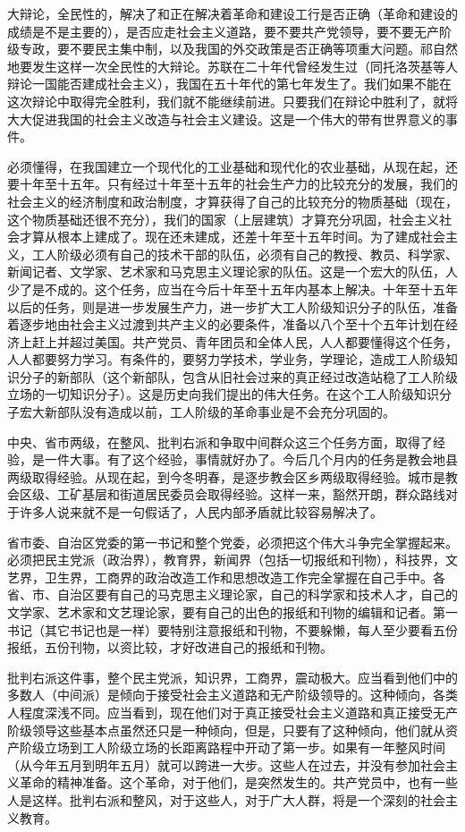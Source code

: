 大辩论，全民性的，解决了和正在解决着革命和建设工行是否正确（革命和建设的成绩是不是主要的），是否应走社会主义道路，要不要共产党领导，要不要无产阶级专政，要不要民主集中制，以及我国的外交政策是否正确等项重大问题。祁自然地要发生这样一次全民性的大辩论。苏联在二十年代曾经发生过（同托洛茨基等人辩论一国能否建成社会主义），我国在五十年代的第七年发生了。我们如果不能在这次辩论中取得完全胜利，我们就不能继续前进。只要我们在辩论中胜利了，就将大大促进我国的社会主义改造与社会主义建设。这是一个伟大的带有世界意义的事件。

必须懂得，在我国建立一个现代化的工业基础和现代化的农业基础，从现在起，还要十年至十五年。只有经过十年至十五年的社会生产力的比较充分的发展，我们的社会主义的经济制度和政治制度，才算获得了自己的比较充分的物质基础（现在，这个物质基础还很不充分），我们的国家（上层建筑）才算充分巩固，社会主义社会才算从根本上建成了。现在还未建成，还差十年至十五年时间。为了建成社会主义，工人阶级必须有自己的技术干部的队伍，必须有自己的教授、教员、科学家、新闻记者、文学家、艺术家和马克思主义理论家的队伍。这是一个宏大的队伍，人少了是不成的。这个任务，应当在今后十年至十五年内基本上解决。十年至十五年以后的任务，则是进一步发展生产力，进一步扩大工人阶级知识分子的队伍，准备着逐步地由社会主义过渡到共产主义的必要条件，准备以八个至十个五年计划在经济上赶上并超过美国。共产党员、青年团员和全体人民，人人都要懂得这个任务，人人都要努力学习。有条件的，要努力学技术，学业务，学理论，造成工人阶级知识分子的新部队（这个新部队，包含从旧社会过来的真正经过改造站稳了工人阶级立场的一切知识分子）。这是历史向我们提出的伟大任务。在这个工人阶级知识分子宏大新部队没有造成以前，工人阶级的革命事业是不会充分巩固的。

中央、省市两级，在整风、批判右派和争取中间群众这三个任务方面，取得了经验，是一件大事。有了这个经验，事情就好办了。今后几个月内的任务是教会地县两级取得经验。从现在起，到今冬明春，是逐步教会区乡两级取得经验。城市是教会区级、工矿基层和街道居民委员会取得经验。这样一来，豁然开朗，群众路线对于许多人说来就不是一句假话了，人民内部矛盾就比较容易解决了。

省市委、自治区党委的第一书记和整个党委，必须把这个伟大斗争完全掌握起来。必须把民主党派（政治界），教育界，新闻界（包括一切报纸和刊物），科技界，文艺界，卫生界，工商界的政治改造工作和思想改造工作完全掌握在自己手中。各省、市、自治区要有自己的马克思主义理论家，自己的科学家和技术人才，自己的文学家、艺术家和文艺理论家，要有自己的出色的报纸和刊物的编辑和记者。第一书记（其它书记也是一样）要特别注意报纸和刊物，不要躲懒，每人至少要看五份报纸，五份刊物，以资比较，才好改进自己的报纸和刊物。

批判右派这件事，整个民主党派，知识界，工商界，震动极大。应当看到他们中的多数人（中间派）是倾向于接受社会主义道路和无产阶级领导的。这种倾向，各类人程度深浅不同。应当看到，现在他们对于真正接受社会主义道路和真正接受无产阶级领导这些基本点虽然还只是一种倾向，但是，只要有了这种倾向，他们就从资产阶级立场到工人阶级立场的长距离路程中开动了第一步。如果有一年整风时间（从今年五月到明年五月）就可以跨进一大步。这些人在过去，并没有参加社会主义革命的精神准备。这个革命，对于他们，是突然发生的。共产党员中，也有一些人是这样。批判右派和整风，对于这些人，对于广大人群，将是一个深刻的社会主义教育。

